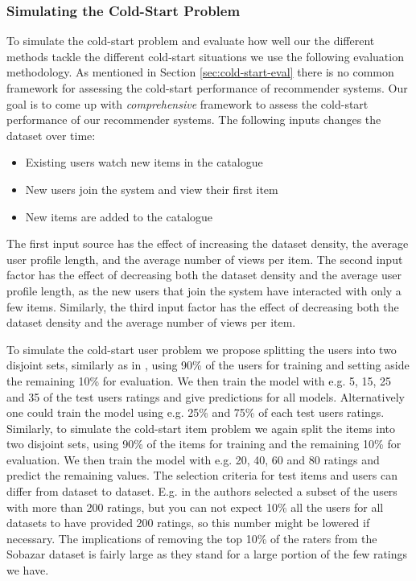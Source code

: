 \subsubsection{Simulating the Cold-Start Problem}

To simulate the cold-start problem and evaluate how well our the different
methods tackle the different cold-start situations we use the following
evaluation methodology. As mentioned in Section \ref{sec:cold-start-eval} there is
no common framework for assessing the cold-start performance of recommender systems.
Our goal is to come up with \emph{comprehensive} framework to assess the cold-start
performance of our recommender systems. The following inputs changes the dataset over time:

\begin{itemize}
	\item 	Existing users watch new items in the catalogue
	\item	New users join the system and view their first item
	\item	New items are added to the catalogue
\end{itemize}

The first input source has the effect of increasing the dataset density, the average user
profile length, and the average number of views per item. The second input factor has
the effect of decreasing both the dataset density and the average user profile length,
as the new users that join the system have interacted with only a few items. Similarly,
the third input factor has the effect of decreasing both the dataset density and the average
number of views per item.

To simulate the cold-start user problem we propose splitting the users into two disjoint
sets, similarly as in \cite{Stern2009, Lam2008}, using 90\% of the users for training and
setting aside the remaining 10\% for evaluation. We then train the model with e.g. 5, 15,
25 and 35 of the test users ratings and give predictions for all models. Alternatively one could train the model
using e.g. 25\% and 75\% of each test users ratings. Similarly, to simulate the cold-start
item problem we again split the items into two disjoint sets, using 90\% of the items
for training and the remaining 10\% for evaluation.  We then train the model with
e.g. 20, 40, 60 and 80 ratings and predict the remaining values. The selection criteria
for test items and users can differ from dataset to dataset. E.g. in \cite{Rashid2002, Rashid2008}
the authors selected a subset of the users with more than 200 ratings, but you can not
expect 10\% all the users for all datasets to have provided 200 ratings, so this number
might be lowered if necessary. The implications of removing the top 10\% of the
raters from the Sobazar dataset is fairly large as they stand for a large portion
of the few ratings we have.

